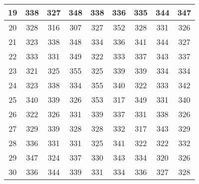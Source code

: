 \documentclass[11pt]{article}
\begin{document}
\begin{table}[!h]
\begin{center}
\begin{tabular}{| c | c | c | c | c | c | c | c | c |}
			19 & 338 & 327 & 348 & 338 & 336 & 335 & 344 & 347 \\ \hline
			20 & 328 & 316 & 307 & 327 & 352 & 328 & 331 & 326 \\ \hline
			21 & 323 & 338 & 348 & 334 & 336 & 341 & 344 & 327 \\ \hline
			22 & 333 & 331 & 349 & 322 & 333 & 337 & 343 & 337 \\ \hline
			23 & 321 & 325 & 355 & 325 & 339 & 339 & 334 & 334 \\ \hline
			24 & 323 & 338 & 334 & 355 & 340 & 322 & 333 & 342 \\ \hline
			25 & 340 & 339 & 326 & 353 & 317 & 349 & 331 & 340 \\ \hline
			26 & 322 & 326 & 331 & 339 & 337 & 331 & 338 & 326 \\ \hline
			27 & 329 & 339 & 328 & 328 & 332 & 317 & 343 & 329 \\ \hline
			28 & 336 & 331 & 331 & 325 & 341 & 322 & 322 & 332 \\ \hline
			29 & 347 & 324 & 337 & 330 & 343 & 334 & 320 & 326 \\ \hline
			30 & 336 & 344 & 339 & 331 & 334 & 336 & 327 & 328 \\ \hline
		\end{tabular}
	\end{center}
\end{table}
\end{document}
